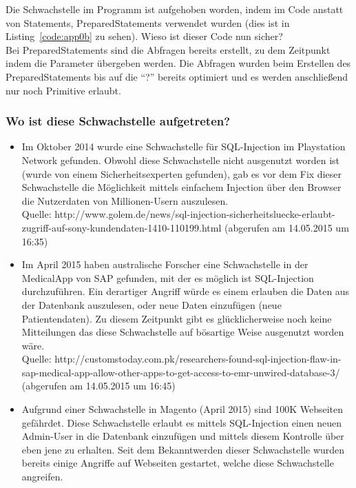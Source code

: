 \documentclass[12pt,a4paper,titlepage,oneside]{scrartcl}
\begin{document}
Die Schwachstelle im Programm ist aufgehoben worden, indem im Code anstatt von Statements, PreparedStatements verwendet wurden (dies ist in Listing~\ref*{code:app0b} zu sehen). Wieso ist dieser Code nun sicher? \\
Bei PreparedStatements sind die Abfragen bereits erstellt, zu dem Zeitpunkt indem die Parameter übergeben werden. Die Abfragen wurden beim Erstellen des PreparedStatements bis auf die "`?"' bereits optimiert und es werden anschließend nur noch Primitive erlaubt.

\subsubsection{Wo ist diese Schwachstelle aufgetreten?}

\begin{itemize}
\item Im Oktober 2014 wurde eine Schwachstelle für SQL-Injection im Playstation Network gefunden. Obwohl diese Schwachstelle nicht ausgenutzt worden ist (wurde von einem Sicherheitsexperten gefunden), gab es vor dem Fix dieser Schwachstelle die Möglichkeit mittels einfachem Injection über den Browser die Nutzerdaten von Millionen-Usern auszulesen. \\
Quelle: http://www.golem.de/news/sql-injection-sicherheitsluecke-erlaubt-zugriff-auf-sony-kundendaten-1410-110199.html (abgerufen am 14.05.2015 um 16:35)
\item Im April 2015 haben australische Forscher eine Schwachstelle in der MedicalApp von SAP gefunden, mit der es möglich ist SQL-Injection durchzuführen. Ein derartiger Angriff würde es einem erlauben die Daten aus der Datenbank auszulesen, oder neue Daten einzufügen (neue Patientendaten). Zu diesem Zeitpunkt gibt es glücklicherweise noch keine Mitteilungen das diese Schwachstelle auf bösartige Weise ausgenutzt worden wäre. \\
Quelle: http://customstoday.com.pk/researchers-found-sql-injection-flaw-in-sap-medical-app-allow-other-apps-to-get-access-to-emr-unwired-database-3/ (abgerufen am 14.05.2015 um 16:45)
\item Aufgrund einer Schwachstelle in Magento (April 2015) sind 100K Webseiten gefährdet. Diese Schwachstelle erlaubt es mittels SQL-Injection einen neuen Admin-User in die Datenbank einzufügen und mittels diesem Kontrolle über eben jene zu erhalten. Seit dem Bekanntwerden dieser Schwachstelle wurden bereits einige Angriffe auf Webseiten gestartet, welche diese Schwachstelle angreifen. \\

\end{itemize}
\end{document}
